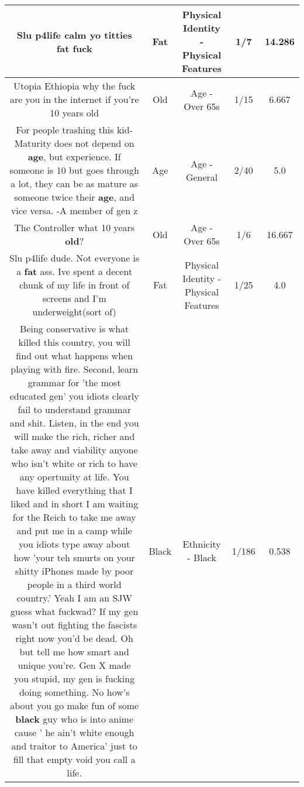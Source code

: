 \documentclass[11pt]{article}
\newlength\mylength
\begin{document}
\begin{center}
\begin{longtable}{|C{.65\mylength}|C{.30\mylength}|C{.12\mylength}|C{.12\mylength}|C{.12\mylength}|}
  \small Slu p4life calm yo titties \textbf{fat} fuck\normalsize   & Fat & Physical Identity - Physical Features & 1/7 & 14.286 \\  \hline
  \small Utopia Ethiopia why the fuck are you in the internet if you're 10 years old\normalsize   & Old & Age - Over 65s & 1/15 & 6.667 \\  \hline
  \small For people trashing this kid- Maturity does not depend on \textbf{age}, but experience. If someone is 10 but goes through a lot, they can be as mature as someone twice their \textbf{age}, and vice versa. -A member of gen z\normalsize   & Age & Age - General & 2/40 & 5.0 \\  \hline
  \small The Controller what 10 years \textbf{old}?\normalsize   & Old & Age - Over 65s & 1/6 & 16.667 \\  \hline
  \small Slu p4life dude. Not everyone is a \textbf{fat} ass. Ive spent a decent chunk of my life in front of screens and I'm underweight(sort of)\normalsize   & Fat & Physical Identity - Physical Features & 1/25 & 4.0 \\  \hline
  \small Being conservative is what killed this country, you will find out what happens when playing with fire. Second, learn grammar for 'the most educated gen' you idiots clearly fail to understand grammar and shit. Listen, in the end you will make the rich, richer and take away and viability anyone who isn't white or rich to have any opertunity at life. You have killed everything that I liked and in short I am waiting for the Reich to take me away and put me in a camp while you idiots type away about how 'your teh smurts on your shitty iPhones made by poor people in a third world country.' Yeah I am an SJW guess what fuckwad? If my gen wasn't out fighting the fascists right now you'd be dead. Oh but tell me how smart and unique you're. Gen X made you stupid, my gen is fucking doing something. No how's about you go make fun of some \textbf{black} guy who is into anime cause ' he ain't white enough and traitor to America'  just to fill that empty void you call a life.\normalsize   & Black & Ethnicity - Black & 1/186 & 0.538 \\  \hline

\end{longtable}
\end{center}
\end{document}

